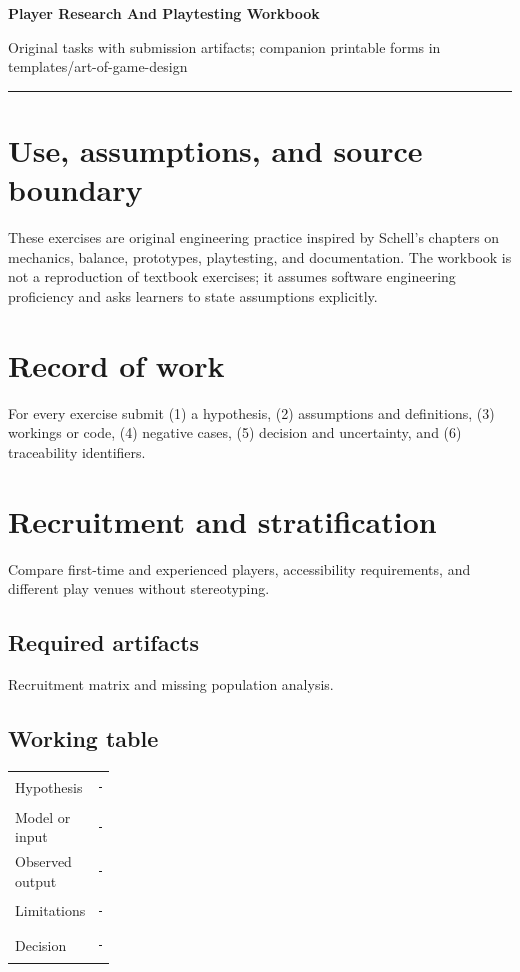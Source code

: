\documentclass[11pt]{article}
\begin{document}
{\huge\bfseries\color{suiteblue} Player Research And Playtesting Workbook}\par
\vspace{0.15in}
{\normalsize\color{suitegray} Original tasks with submission artifacts; companion printable forms in templates/art-of-game-design}\par
\vspace{0.15in}\hrule\vspace{0.15in}

\section{Use, assumptions, and source boundary}
These exercises are original engineering practice inspired by Schell's chapters on mechanics, balance, prototypes, playtesting, and documentation. The workbook is not a reproduction of textbook exercises; it assumes software engineering proficiency and asks learners to state assumptions explicitly.


\section{Record of work}
For every exercise submit (1) a hypothesis, (2) assumptions and definitions, (3) workings or code, (4) negative cases, (5) decision and uncertainty, and (6) traceability identifiers.


\section{Recruitment and stratification}
Compare first-time and experienced players, accessibility requirements, and different play venues without stereotyping.


\subsection{Required artifacts}
Recruitment matrix and missing population analysis.


\subsection{Working table}
\begin{tabularx}{\linewidth}{@{}p{0.20\linewidth}X@{}}\toprule
Hypothesis & \rule{0.90\linewidth}{0.4pt}\\[0.35cm]
Model or input & \rule{0.90\linewidth}{0.4pt}\\[0.35cm]
Observed output & \rule{0.90\linewidth}{0.4pt}\\[0.35cm]
Limitations & \rule{0.90\linewidth}{0.4pt}\\[0.35cm]
Decision & \rule{0.90\linewidth}{0.4pt}\\\bottomrule\end{tabularx}
\end{document}
